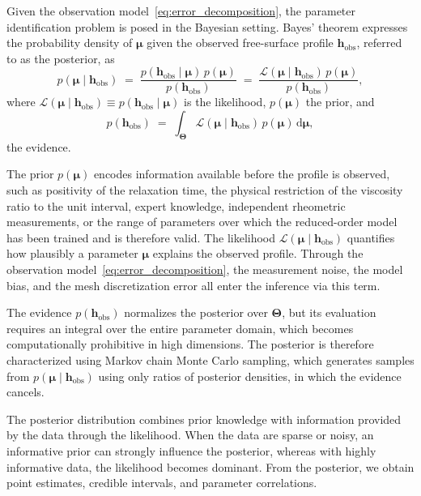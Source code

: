 \documentclass{elsarticle}
\renewcommand{\vec}[1]{\boldsymbol{#1}}
\newcommand{\params}{\boldsymbol{\mu}}
\newcommand{\paramspace}{\boldsymbol{\Theta}}
\newcommand{\obs}{\mathrm{obs}}
\begin{document}
Given the observation model~\eqref{eq:error_decomposition}, the parameter
identification problem is posed in the Bayesian setting. Bayes' theorem
expresses the probability density of $\params$ given the observed free-surface
profile $\vec{h}_{\obs}$, referred to as the posterior, as
\begin{equation}
p(\params \mid \vec{h}_{\obs})
\;=\;
\frac{p(\vec{h}_{\obs} \mid \params)\,p(\params)}
     {p(\vec{h}_{\obs})}
\;=\;
\frac{\mathcal{L}(\params \mid \vec{h}_{\obs})\,p(\params)}
     {p(\vec{h}_{\obs})},
\label{eq:bayes_intro}
\end{equation}
where
$\mathcal{L}(\params \mid \vec{h}_{\obs}) \equiv p(\vec{h}_{\obs} \mid \params)$
is the likelihood, $p(\params)$ the prior, and
\begin{equation}
p(\vec{h}_{\obs})
\;=\;
\int_{\paramspace}
\mathcal{L}(\params \mid \vec{h}_{\obs})\,p(\params)\,
\mathrm{d}\params,
\label{eq:evidence}
\end{equation}
the evidence.

The prior $p(\params)$ encodes information available before the profile is
observed, such as positivity of the relaxation time, the physical restriction
of the viscosity ratio to the unit interval, expert knowledge, independent
rheometric measurements, or the range of parameters over which the reduced-order
model has been trained and is therefore valid. The likelihood
$\mathcal{L}(\params \mid \vec{h}_{\obs})$ quantifies how plausibly a parameter
$\params$ explains the observed profile. Through the observation
model~\eqref{eq:error_decomposition}, the measurement noise, the model bias,
and the mesh discretization error all enter the inference via this term.

The evidence $p(\vec{h}_{\obs})$ normalizes the posterior over $\paramspace$,
but its evaluation requires an integral over the entire parameter domain, which
becomes computationally prohibitive in high dimensions. The posterior is
therefore characterized using Markov chain Monte Carlo sampling, which generates
samples from $p(\params \mid \vec{h}_{\obs})$ using only ratios of posterior
densities, in which the evidence cancels.

The posterior distribution combines prior knowledge with information provided by the data through the likelihood. When the data are sparse or noisy, an informative prior can strongly influence the posterior, whereas with highly informative data, the likelihood becomes dominant. From the posterior, we obtain point estimates, credible intervals, and parameter correlations.
\end{document}
